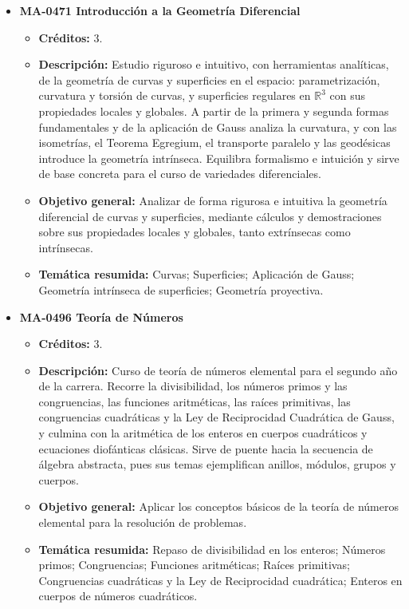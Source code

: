 \begin{itemize}[leftmargin=1.3em, itemsep=10pt, topsep=4pt, label={\color{Azul-UCR}$\blacksquare$}]
\item {\color{Azul-UCR}\textbf{MA-0471 Introducción a la Geometría Diferencial}}\par\nopagebreak\smallskip
\begin{itemize}[leftmargin=1.1em, itemsep=3pt, topsep=2pt, parsep=2pt, label={\textendash}]
\item \textbf{Créditos:} 3.
\item \textbf{Descripción:} Estudio riguroso e intuitivo, con herramientas analíticas, de la geometría de curvas y superficies en el espacio: parametrización, curvatura y torsión de curvas, y superficies regulares en $\mathbb{R}^3$ con sus propiedades locales y globales. A partir de la primera y segunda formas fundamentales y de la aplicación de Gauss analiza la curvatura, y con las isometrías, el Teorema Egregium, el transporte paralelo y las geodésicas introduce la geometría intrínseca. Equilibra formalismo e intuición y sirve de base concreta para el curso de variedades diferenciales.
\item \textbf{Objetivo general:} Analizar de forma rigurosa e intuitiva la geometría diferencial de curvas y superficies, mediante cálculos y demostraciones sobre sus propiedades locales y globales, tanto extrínsecas como intrínsecas.
\item \textbf{Temática resumida:} Curvas; Superficies; Aplicación de Gauss; Geometría intrínseca de superficies; Geometría proyectiva.
\end{itemize}

\item {\color{Azul-UCR}\textbf{MA-0496 Teoría de Números}}\par\nopagebreak\smallskip
\begin{itemize}[leftmargin=1.1em, itemsep=3pt, topsep=2pt, parsep=2pt, label={\textendash}]
\item \textbf{Créditos:} 3.
\item \textbf{Descripción:} Curso de teoría de números elemental para el segundo año de la carrera. Recorre la divisibilidad, los números primos y las congruencias, las funciones aritméticas, las raíces primitivas, las congruencias cuadráticas y la Ley de Reciprocidad Cuadrática de Gauss, y culmina con la aritmética de los enteros en cuerpos cuadráticos y ecuaciones diofánticas clásicas. Sirve de puente hacia la secuencia de álgebra abstracta, pues sus temas ejemplifican anillos, módulos, grupos y cuerpos.
\item \textbf{Objetivo general:} Aplicar los conceptos básicos de la teoría de números elemental para la resolución de problemas.
\item \textbf{Temática resumida:} Repaso de divisibilidad en los enteros; Números primos; Congruencias; Funciones aritméticas; Raíces primitivas; Congruencias cuadráticas y la Ley de Reciprocidad cuadrática; Enteros en cuerpos de números cuadráticos.
\end{itemize}


\end{itemize}
